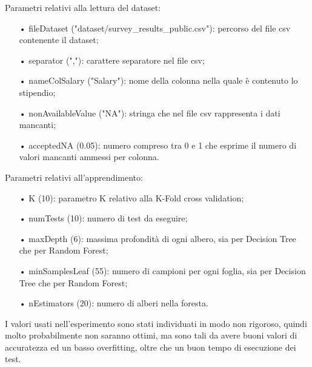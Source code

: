 \documentclass[]{article}
\begin{document}
Parametri relativi alla lettura del dataset:
\begin{enumerate}
\item[•] fileDataset ("dataset/survey\_results\_public.csv"): percorso del file csv contenente il dataset;
\item[•] separator (","): carattere separatore nel file csv;
\item[•] nameColSalary ("Salary"): nome della colonna nella quale è contenuto lo stipendio;
\item[•] nonAvailableValue ("NA"): stringa che nel file csv rappresenta i dati mancanti;
\item[•] acceptedNA (0.05): numero compreso tra 0 e 1 che esprime il numero di valori mancanti ammessi per colonna.
\end{enumerate}
Parametri relativi all'apprendimento:
\begin{enumerate}
\item[•] K (10): parametro K relativo alla K-Fold cross validation;
\item[•] numTests (10): numero di test da eseguire;
\item[•] maxDepth (6): massima profondità di ogni albero, sia per Decision Tree che per Random Forest;
\item[•] minSamplesLeaf (55): numero di campioni per ogni foglia, sia per Decision Tree che per Random Forest;
\item[•] nEstimators (20): numero di alberi nella foresta.
\end{enumerate}

I valori usati nell'esperimento sono stati individuati in modo non rigoroso, quindi molto probabilmente non saranno ottimi, ma sono tali da avere buoni valori di accuratezza ed un basso overfitting, oltre che un buon tempo di esecuzione dei test.
\end{document}
